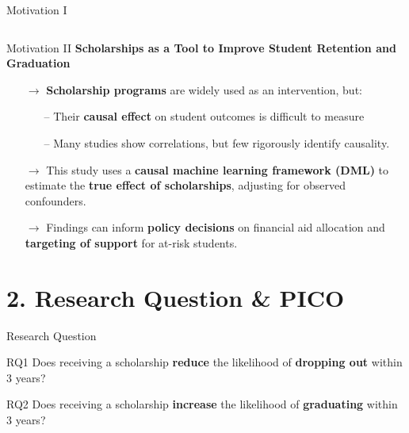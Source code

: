 \documentclass[aspectratio=169]{beamer}
\begin{document}
\begin{frame}{Motivation I}
\begin{columns}
\end{columns}

  	
  \end{frame}
  
  \begin{frame}{Motivation II}
  	\textbf{Scholarships as a Tool to Improve Student Retention and Graduation}
  	
  	\begin{itemize}
  		\item [$\rightarrow$]  \textbf{Scholarship programs} are widely used as an intervention, but:
  		\begin{itemize}
  		  		\item [--] Their  \textbf{causal effect} on student outcomes is difficult to measure
  		  		\item [--] Many studies show correlations, but few rigorously identify causality.
   		\end{itemize}
   		\item [$\rightarrow$] This study uses a \textbf{causal machine learning framework (DML)} to estimate the  \textbf{true effect of scholarships}, adjusting for observed confounders.
   		\item [$\rightarrow$] Findings can inform \textbf{policy decisions} on financial aid allocation and \textbf{targeting of support} for at-risk students.
  	\end{itemize}
  \end{frame}
  
  
 \section{2. Research Question \& PICO}
  
    \begin{frame}{Research Question}
    \begin{alertblock}{RQ1}
	Does receiving a scholarship \textbf{reduce} the likelihood of \textbf{dropping out} within 3 years?
\end{alertblock}
\vspace{10pt}
    \begin{alertblock}{RQ2}
	Does receiving a scholarship \textbf{increase} the likelihood of \textbf{graduating} within 3 years?
\end{alertblock}
  \end{frame}
  
\end{document}
